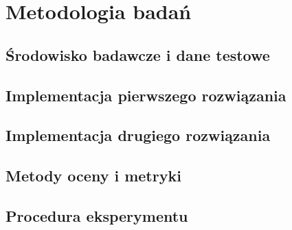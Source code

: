 \chapter{Metodologia badań}
\label{chap:metodologia}

\section{Środowisko badawcze i dane testowe}


\section{Implementacja pierwszego rozwiązania}


\section{Implementacja drugiego rozwiązania}


\section{Metody oceny i metryki}


\section{Procedura eksperymentu}

